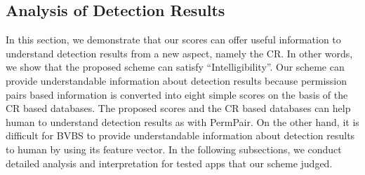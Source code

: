 \documentclass{ieeeaccess}
\begin{document}
\subsection{Analysis of Detection Results} \label{subsec:analysis}
In this section, we demonstrate that our scores can offer useful information to understand detection results from a new aspect, namely the CR.
In other words, we show that the proposed scheme can satisfy ``Intelligibility''.
Our scheme can provide understandable information about detection results because permission pairs based information is converted into eight simple scores on the basis of the CR based databases.
The proposed scores and the CR based databases can help human to understand detection results as with PermPair.
On the other hand, it is difficult for BVBS to provide understandable information about detection results to human by using its feature vector.
In the following subsections, we conduct detailed analysis and interpretation for tested apps that our scheme judged.
\end{document}

